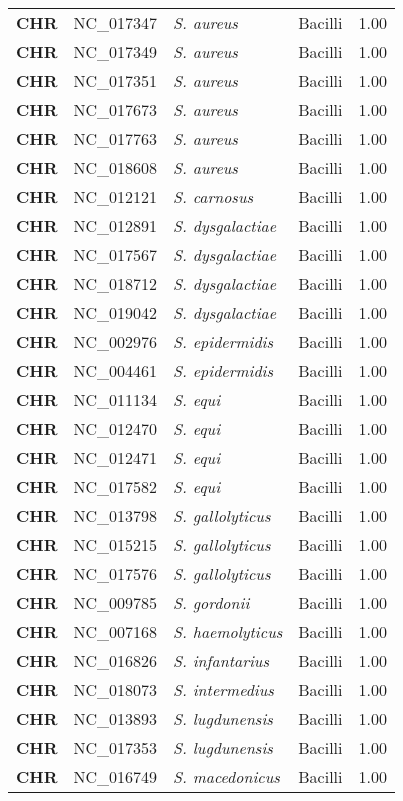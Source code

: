 \begin{adjustwidth}{-3cm}{2cm}
{\begin{supertabular}{>{\bfseries}l|p{0.1\textwidth}p{0.14\textwidth}l|l}
CHR & NC\_017347 & \textit{S. aureus} & Bacilli & 1.00\\
CHR & NC\_017349 & \textit{S. aureus} & Bacilli & 1.00\\
CHR & NC\_017351 & \textit{S. aureus} & Bacilli & 1.00\\
CHR & NC\_017673 & \textit{S. aureus} & Bacilli & 1.00\\
CHR & NC\_017763 & \textit{S. aureus} & Bacilli & 1.00\\
CHR & NC\_018608 & \textit{S. aureus} & Bacilli & 1.00\\
CHR & NC\_012121 & \textit{S. carnosus} & Bacilli & 1.00\\
CHR & NC\_012891 & \textit{S. dysgalactiae} & Bacilli & 1.00\\
CHR & NC\_017567 & \textit{S. dysgalactiae} & Bacilli & 1.00\\
CHR & NC\_018712 & \textit{S. dysgalactiae} & Bacilli & 1.00\\
CHR & NC\_019042 & \textit{S. dysgalactiae} & Bacilli & 1.00\\
CHR & NC\_002976 & \textit{S. epidermidis} & Bacilli & 1.00\\
CHR & NC\_004461 & \textit{S. epidermidis} & Bacilli & 1.00\\
CHR & NC\_011134 & \textit{S. equi} & Bacilli & 1.00\\
CHR & NC\_012470 & \textit{S. equi} & Bacilli & 1.00\\
CHR & NC\_012471 & \textit{S. equi} & Bacilli & 1.00\\
CHR & NC\_017582 & \textit{S. equi} & Bacilli & 1.00\\
CHR & NC\_013798 & \textit{S. gallolyticus} & Bacilli & 1.00\\
CHR & NC\_015215 & \textit{S. gallolyticus} & Bacilli & 1.00\\
CHR & NC\_017576 & \textit{S. gallolyticus} & Bacilli & 1.00\\
CHR & NC\_009785 & \textit{S. gordonii} & Bacilli & 1.00\\
CHR & NC\_007168 & \textit{S. haemolyticus} & Bacilli & 1.00\\
CHR & NC\_016826 & \textit{S. infantarius} & Bacilli & 1.00\\
CHR & NC\_018073 & \textit{S. intermedius} & Bacilli & 1.00\\
CHR & NC\_013893 & \textit{S. lugdunensis} & Bacilli & 1.00\\
CHR & NC\_017353 & \textit{S. lugdunensis} & Bacilli & 1.00\\
CHR & NC\_016749 & \textit{S. macedonicus} & Bacilli & 1.00\\

\end{supertabular}}
\end{adjustwidth}
